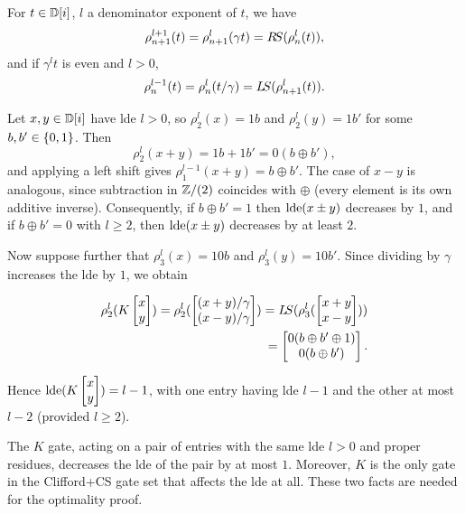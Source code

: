 \documentclass[reprint,amsmath,amssymb,aps,pra]{revtex4-2}
\begin{document}
\begin{lemma}
  \label{lem:right-shift}
  For $t\in {\mathbb D} [i]$, $l$ a denominator exponent of $t$, we have
  \[
    \rho_{n+1}^{l+1}(t) = \rho_{n+1}^{l}(\gamma t) =
    R\kern-.16667em S(\rho_n^{l}(t)),
  \]
  and if $\gamma ^ l t$ is even and $l>0$,
  \[
    \rho_{n}^{l-1}(t) = \rho_{n}^{l}(t/\gamma) =
    L\kern-.16667em S(\rho_{n+1}^{l}(t)).
  \]
\end{lemma}

Let $x, y \in {\mathbb D}[i]$ have lde $l > 0$, so $\rho_2^l(x) = 1b$ and
$\rho_2^l(y) = 1b'$ for some $b, b' \in \left\{0,1\right\}$. Then
\[ \rho_2^l(x + y) = 1b + 1b' = 0(b \oplus b'), \] and applying a left
shift gives $\rho_1^{l-1}(x+y) = b \oplus b'$. The case of $x - y$ is
analogous, since subtraction in $\mathbb{Z}/(2)$ coincides with $\oplus$
(every element is its own additive inverse). Consequently, if
$b \oplus b' = 1$ then $\operatorname{lde}(x \pm y)$ decreases by $1$, and if
$b \oplus b' = 0$ with $l \ge 2$, then $\operatorname{lde}(x \pm y)$ decreases by at
least $2$.

Now suppose further that $\rho_3^l(x) = 10b$ and $\rho_3^l(y) = 10b'$.
Since dividing by $\gamma$ increases the lde by $1$, we obtain

\begin{align*}
  \rho_2^l(K \begin{bmatrix}
    x \\
    y
  \end{bmatrix})
  =
  \rho_2^l(\begin{bmatrix}
    (x+y)/{\gamma} \\
    (x-y)/{\gamma}
  \end{bmatrix})
  =
  L\kern-.16667em S(\rho_3^l(\begin{bmatrix}
    x+y \\
    x-y
  \end{bmatrix})) \\
  =
  \begin{bmatrix}
    0(b \oplus b' \oplus 1) \\
    0(b \oplus b')
  \end{bmatrix}.
\end{align*}

Hence $\operatorname{lde}(K
\begin{bmatrix}
  x \\
  y
\end{bmatrix}) = l-1$, with one entry having lde $l-1$ and the other
at most $l-2$ (provided $l\ge 2$).

\begin{remark}
  \label{rmk:dec1}
  The $K$ gate, acting on a pair of entries with the same lde $l > 0$
  and proper residues, decreases the lde of the pair by at most
  $1$. Moreover, $K$ is the only gate in the Clifford+CS gate set that
  affects the lde at all. These two facts are needed for the
  optimality proof.
\end{remark}
\end{document}
